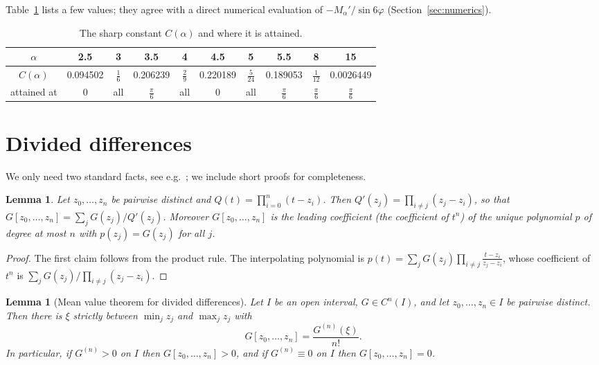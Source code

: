 \documentclass[11pt]{amsart}
\newtheorem{lemma}[theorem]{Lemma}
\theoremstyle{remark}
\begin{document}
Table~\ref{tab:C} lists a few values; they agree with a direct numerical evaluation of
$-M_\alpha'/\sin6\varphi$ (Section~\ref{sec:numerics}).

\begin{table}[ht]
\centering
\begin{tabular}{c|ccccccccc}
$\alpha$ & 2.5 & 3 & 3.5 & 4 & 4.5 & 5 & 5.5 & 8 & 15\\\hline
$C(\alpha)$ & 0.094502 & $\frac16$ & 0.206239 & $\frac29$ & 0.220189 & $\frac5{24}$ &
0.189053 & $\frac1{12}$ & 0.0026449\\
attained at & $0$ & all & $\frac\pi6$ & all & $0$ & all & $\frac\pi6$ & $\frac\pi6$ &
$\frac\pi6$
\end{tabular}
\caption{The sharp constant $C(\alpha)$ and where it is attained.}
\label{tab:C}
\end{table}

\section{Divided differences}

We only need two standard facts, see e.g.~\cite{dB}; we include short proofs for
completeness.

\begin{lemma}\label{lem:lagrange}
Let $z_0,\dots,z_n$ be pairwise distinct and $Q(t)=\prod_{i=0}^n(t-z_i)$. Then
$Q'(z_j)=\prod_{i\ne j}(z_j-z_i)$, so that
$G[z_0,\dots,z_n]=\sum_j G(z_j)/Q'(z_j)$. Moreover $G[z_0,\dots,z_n]$ is the leading
coefficient (the coefficient of $t^n$) of the unique polynomial $p$ of degree at most $n$
with $p(z_j)=G(z_j)$ for all $j$.
\end{lemma}

\begin{proof}
The first claim follows from the product rule. The interpolating polynomial is
$p(t)=\sum_j G(z_j)\prod_{i\ne j}\frac{t-z_i}{z_j-z_i}$, whose coefficient of $t^n$ is
$\sum_j G(z_j)/\prod_{i\ne j}(z_j-z_i)$.
\end{proof}

\begin{lemma}[Mean value theorem for divided differences]\label{lem:mvt}
Let $I$ be an open interval, $G\in C^n(I)$, and let $z_0,\dots,z_n\in I$ be pairwise
distinct. Then there is $\xi$ strictly between $\min_j z_j$ and $\max_j z_j$ with
\[
G[z_0,\dots,z_n]=\frac{G^{(n)}(\xi)}{n!}.
\]
In particular, if $G^{(n)}>0$ on $I$ then $G[z_0,\dots,z_n]>0$, and if $G^{(n)}\equiv0$
on $I$ then $G[z_0,\dots,z_n]=0$.
\end{lemma}
\end{document}
